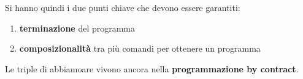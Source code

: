 				      					      			Si hanno quindi i due punti chiave che devono essere garantiti:
				      					      			\begin{enumerate}
				      					      				\item \textbf{terminazione} del programma
				      					      				\item \textbf{composizionalità} tra più comandi per ottenere un programma
				      					      			\end{enumerate}
				      					      			Le triple di abbiamoare vivono ancora nella \textbf{programmazione by contract}.